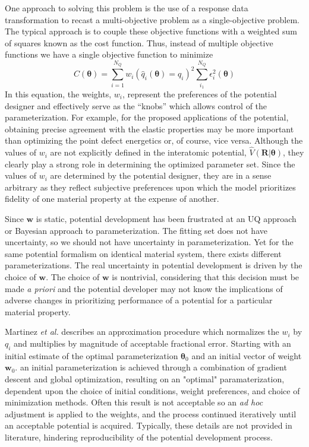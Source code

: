 One approach to solving this problem is the use of a response data transformation to recast a multi-objective problem as a single-objective problem.  The typical approach is to couple these objective functions with a weighted sum of squares known as the cost function. Thus, instead of multiple objective functions we have a single objective function to minimize
\begin{equation}
	\label{eq:cost_function_LS}
	C(\bm{\theta})=\sum_{i=1}^{N_Q}w_i(\hat{q}_i(\bm{\theta})=q_i)^2
		\sum_{i_1}^{N_Q} \epsilon_i^2(\bm{\theta})
\end{equation}
In this equation, the weights, $w_i$, represent the preferences of the potential designer and effectively serve as the “knobs” which allows control of the parameterization. For example, for the proposed applications of the potential, obtaining precise agreement with the elastic properties may be more important than optimizing the point defect energetics or, of course, vice versa. Although the values of $w_i$ are not explicitly defined in the interatomic potential, $\hat{V}(\bm{R}|\bm{\theta})$, they clearly play a strong role in determining the optimized parameter set.  Since the values of $w_i$ are determined by the potential designer, they are in a sense arbitrary as they reflect subjective preferences upon which the model prioritizes fidelity of one material property at the expense of another.

Since $\bm{w}$ is static, potential development has been frustrated at an UQ approach or Bayesian approach to parameterization.  The fitting set does not have uncertainty, so we should not have uncertainty in parameterization.  Yet for the same potential formalism on identical material system, there exists different parameterizations.  The real uncertainty in potential development is driven by the choice of $\bm{w}$.  The choice of $\bm{w}$ is nontrivial, considering that this decision must be made \emph{a priori} and the potential developer may not know the implications of adverse changes in prioritizing performance of a potential for a particular material property.

Martinez \emph{et al.}\cite{martinez2013_fitting,martinez2016_posmat} describes an approximation procedure which normalizes the $w_i$ by $q_i$ and multiplies by magnitude of acceptable fractional error.  Starting with an initial estimate of the optimal parameterization $\bm{\theta}_0$ and an initial vector of weight $\bm{w}_0$. an initial parameterization is achieved through a combination of gradient descent and global optimization, resulting on an "optimal" paramaterization, dependent upon the choice of initial conditions, weight preferences, and choice of minimization methods.  Often this result is not acceptable so an \emph{ad hoc} adjustment is applied to the weights, and the process continued iteratively until an acceptable potential is acquired.  Typically, these details are not provided in literature, hindering reproducibility of the potential development process.

